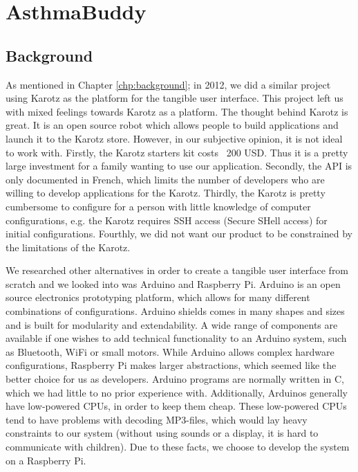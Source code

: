 \chapter{AsthmaBuddy}
\label{chp:our-solution}

\section{Background}
As mentioned in Chapter \ref{chp:background}; in 2012, we did a similar project using Karotz as the platform for the tangible user interface\cite{CustomerDriven}.
This project left us with mixed feelings towards Karotz as a platform. The thought behind Karotz is great. It is an open source robot which allows people to build applications and launch it to the Karotz store. However, in our subjective opinion, it is not ideal to work with. Firstly, the Karotz starters kit costs ~200 USD. Thus it is a pretty large investment for a family wanting to use our application. Secondly, the API is only documented in French, which limits the number of developers who are willing to develop applications for the Karotz. Thirdly, the Karotz is pretty cumbersome to configure for a person with little knowledge of computer configurations, e.g. the Karotz requires SSH access (Secure SHell access) for initial configurations. Fourthly, we did not want our product to be constrained by the limitations of the Karotz.

We researched other alternatives in order to create a tangible user interface from scratch and we looked into was Arduino and Raspberry Pi. Arduino is an open source electronics prototyping platform\cite{arduino}, which allows for many different combinations of configurations. Arduino shields comes in many shapes and sizes and is built for modularity and extendability. A wide range of components are available if one wishes to add technical functionality to an Arduino system, such as Bluetooth, WiFi or small motors. 
While Arduino allows complex hardware configurations, Raspberry Pi makes larger abstractions, which seemed like the better choice for us as developers. Arduino programs are normally written in C\cite{strahl2000language}, which we had little to no prior experience with. Additionally, Arduinos generally have low-powered CPUs, in order to keep them cheap. These low-powered CPUs tend to have problems with decoding MP3-files, which would lay heavy constraints to our system (without using sounds or a display, it is hard to communicate with children). Due to these facts, we choose to develop the system on a Raspberry Pi.

